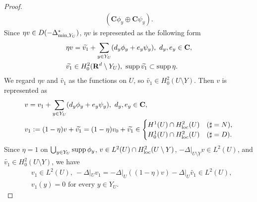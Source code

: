 \documentclass[12pt,a4paper]{article}
\def\supp{\mathop{\rm supp}\nolimits}
\def\min{\mathop{\rm min}\limits}
\begin{document}
\begin{proof}
\begin{align*}
(\mathbf{C}\phi_y\oplus \mathbf{C}\psi_y).
\end{align*}
Since $\eta v\in D(-\Delta_{\min ,Y_U}^*)$,
$\eta v$ is represented as the following form
\begin{align*}
& \eta v = \widetilde{v_1} + \sum_{y\in Y_U}(d_y \phi_y+e_y \psi_y),
\ d_y,e_y\in \mathbf{C},
\\
&\widetilde{v_1}\in H^2_0(\mathbf{R}^d\setminus Y_U),\ 
\supp \widetilde{v_1}\subset \supp \eta.
\end{align*}
We regard $\eta v$ and $\widetilde{v_1}$ as the functions on $U$,
so $\widetilde{v_1}\in H^2_0(U\setminus Y)$.
Then $v$ is represented as
\begin{align}
\label{06_22}
& v = v_1+ \sum_{y\in Y_U}(d_y \phi_y+e_y \psi_y),\ 
d_y,e_y\in \mathbf{C},
\\
& v_1:
=
(1-\eta)v+\widetilde{v_1}
=
(1-\eta)v_0+\widetilde{v_1}
\in  
\begin{cases}
H^1(U)\cap H^2_{\rm loc}(U) & (\sharp=N),\\
H^1_0(U)\cap H^2_{\rm loc}(U) & (\sharp=D).
\end{cases}
\label{06_23}
\end{align}
Since $\eta=1$ on $\bigcup_{y\in Y_U}\supp \phi_y$,
$v\in L^2(U)\cap H^2_{\rm loc}(U\setminus Y)$,
$-\Delta|_{U\setminus Y}v\in L^2(U)$, 
and $\widetilde{v_1}\in H^2_0(U\setminus Y)$,
we have
\begin{align}
&
v_1\in L^2(U),\ 
-\Delta|_U v_1= -\Delta|_U((1-\eta)v)-\Delta|_U \widetilde{v_1}\in L^2(U),
\label{06_24}\\
&v_1(y)=0\mbox{ for every }y\in Y_U.
\label{06_25}
\end{align}


\end{proof}
\end{document}
